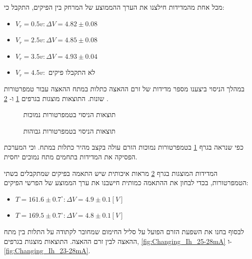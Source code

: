 \documentclass{article}
\begin{document}
מכל אחת מהמדידות חילצנו את הערך ההממוצע של המרחק בין הפיקים, התקבל כי:
\begin{itemize}
    \item $V_r=0.5v: \Delta V =4.82 \pm 0.08$
    \item $V_r=2.5v: \Delta V =4.85 \pm 0.08$
    \item $V_r=3.5v: \Delta V =4.93 \pm 0.04$
    \item $V_r=4.5v:$ לא התקבלו פיקים
\end{itemize}


במהלך הניסוי ביצענו מספר מדידות של זרם ההאצה כתלות במתח ההאצה עבור טמפרטורות שונות.
התוצאות מוצגות בגרפים
\ref{graph:Changing_temp_0-10v}
ו-
\ref{graph:Changing_temp_0-30v}
.

\begin{graph}[H]
    \begin{subfigure}[b]{\textwidth}
    	\centering
    	\resizebox{0.95\textwidth}{!}{}
    	\caption{תוצאות הניסוי בטמפרטורות נמוכות}
    	\label{graph:Changing_temp_0-10v}
    \end{subfigure}
    \hfill
    \begin{subfigure}[b]{\textwidth}
    	\centering
    	\resizebox{0.95\textwidth}{!}{}
    	\caption{תוצאות הניסוי בטמפרטורות גבוהות}
    	\label{graph:Changing_temp_0-30v}
    \end{subfigure}
    \label{graph:Changing_temp}
\end{graph}

כפי שנראה בגרף 
\ref{graph:Changing_temp_0-10v}
בטמפרטורות נמוכות הזרם עולה בקצב מהיר כתלות במתח. 
וכי המערכת הפסיקה את המדידות בתחמים מתח נמוכים יחסית.

המדידות המוצגות בגרף
\ref{graph:Changing_temp_0-30v}
מראות איכותית שיש התאמה בפיקים שמתקבלים בשתי הטמפרטורות, בכדי לבחון את ההתאמה כמותית חישבנו את ערך הממוצע של הפרשי הפיקים:
\begin{itemize}
    \item $T = 161.6 \pm 0.7 ^{\circ}:\Delta V = 4.9 \pm 0.1  [V]$ 
    \item $T = 169.5 \pm 0.7 ^{\circ}:\Delta V = 4.8 \pm 0.1  [V]$ 
\end{itemize}

לבסוף בחנו את השפעת הזרם הפועל על סליל החימום שמחובר לקתודה על התלות בין מתח ההאצה לבין זרם ההאצה.
התוצאות מוצגות בגרפים,
\ref{fig:Changing_Ih_25-28mA}
ו-
\ref{fig:Changing_Ih_23-28mA}.
\end{document}
